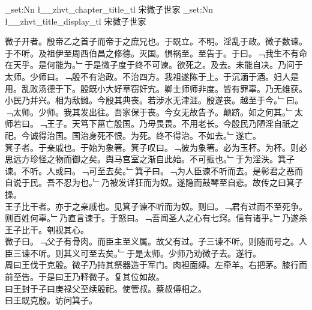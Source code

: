\documentclass{zhvt-classic}
\begin{document}
\clearpage
\ExplSyntaxOn
\tl_set:Nn \l__zhvt_chapter_title_tl { 宋微子世家 }
\tl_set:Nn \l__zhvt_title_display_tl { 宋微子世家 }
\ExplSyntaxOff
\maketitle


\hspace*{2em}微子开者。殷帝乙之首子而帝于之庶兄也。于既立。不明。淫乱于政。微子数谏。于不听。及祖伊至周西伯昌之修德。灭国。惧祸至。至告于。于曰。﹁我生不有命在天乎。是何能为。﹂于是微子度于终不可谏。欲死之。及去。未能自决。乃问于太师。少师曰。﹁殷不有治政。不治四方。我祖遂陈于上。于沉湎于酒。妇人是用。乱败汤德于下。殷既小大好草窃奸宄。卿士师师非度。皆有罪辜。乃无维获。小民乃并兴。相为敌雠。今殷其典丧。若涉水无津涯。殷遂丧。越至于今。﹂曰。﹁太师。少师。我其发出往。吾家保于丧。今女无故告予。颠跻。如之何其。﹂太师若曰。﹁王子。天笃下菑亡殷国。乃毋畏畏。不用老长。今殷民乃陋淫自祇之祀。今诚得治国。国治身死不恨。为死。终不得治。不如去。﹂遂亡。\\
\hspace*{2em}箕子者。于亲戚也。于始为象箸。箕子叹曰。﹁彼为象箸。必为玉杯。为杯。则必思远方珍怪之物而御之矣。舆马宫室之渐自此始。不可振也。﹂于为淫泆。箕子谏。不听。人或曰。﹁可至去矣。﹂箕子曰。﹁为人臣谏不听而去。是彰君之恶而自说于民。吾不忍为也。﹂乃被发详狂而为奴。遂隐而鼓琴至自悲。故传之曰箕子操。\\
\hspace*{2em}王子比干者。亦于之亲戚也。见箕子谏不听而为奴。则曰。﹁君有过而不至死争。则百姓何辜。﹂乃直言谏于。于怒曰。﹁吾闻圣人之心有七窍。信有诸乎。﹂乃遂杀王子比干。刳视其心。\\
\hspace*{2em}微子曰。﹁父子有骨肉。而臣主至义属。故父有过。子三谏不听。则随而号之。人臣三谏不听。则其义可至去矣。﹂于是太师。少师乃劝微子去。遂行。\\
\hspace*{2em}周曰王伐于克殷。微子乃持其祭器造于军门。肉袒面缚。左牵羊。右把茅。膝行而前至告。于是曰王乃释微子。复其位如故。\\
\hspace*{2em}曰王封于子曰庚禄父至续殷祀。使管叔。蔡叔傅相之。\\
\hspace*{2em}曰王既克殷。访问箕子。\\
\end{document}
